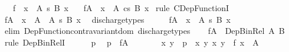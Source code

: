 \begin{isabellebody}
\ \ \ {\isachardoublequoteopen}f\ {\isacharcolon}{\kern0pt}\ {\isacharparenleft}{\kern0pt}x\ {\isacharcolon}{\kern0pt}\ A{\isacharparenright}{\kern0pt}\ {\isasymrightarrow}s\ B\ x{\isachardoublequoteclose}\isanewline
\ \ \ {\isachardoublequoteopen}f{\isasymrestriction}\isactrlbsub A\isactrlesub \ {\isacharcolon}{\kern0pt}\ {\isacharparenleft}{\kern0pt}x\ {\isacharcolon}{\kern0pt}\ A{\isacharparenright}{\kern0pt}\ {\isasymrightarrow}cs\ B\ x{\isachardoublequoteclose}\isanewline
%
\isadelimproof
%
\endisadelimproof
%
\isatagproof
{}\isamarkupfalse%
\ {\isacharparenleft}{\kern0pt}rule\ CDep{\isacharunderscore}{\kern0pt}FunctionI{\isacharparenright}{\kern0pt}\isanewline
\ \ \isamarkupfalse%
\ {\isachardoublequoteopen}f{\isasymrestriction}\isactrlbsub A\isactrlesub \ {\isacharcolon}{\kern0pt}\ {\isacharparenleft}{\kern0pt}x\ {\isacharcolon}{\kern0pt}\ A\ {\isacharampersand}{\kern0pt}\ A{\isacharparenright}{\kern0pt}\ {\isasymrightarrow}s\ B\ x{\isachardoublequoteclose}\ \isamarkupfalse%
\ discharge{\isacharunderscore}{\kern0pt}types\isanewline
\ \ \isamarkupfalse%
\ \isamarkupfalse%
\ {\isachardoublequoteopen}f{\isasymrestriction}\isactrlbsub A\isactrlesub \ {\isacharcolon}{\kern0pt}\ {\isacharparenleft}{\kern0pt}x\ {\isacharcolon}{\kern0pt}\ A{\isacharparenright}{\kern0pt}\ {\isasymrightarrow}s\ B\ x{\isachardoublequoteclose}\isanewline
\ \ \ \ \isamarkupfalse%
\ {\isacharparenleft}{\kern0pt}elim\ Dep{\isacharunderscore}{\kern0pt}Function{\isacharunderscore}{\kern0pt}contravariant{\isacharunderscore}{\kern0pt}dom{\isacharparenright}{\kern0pt}\ discharge{\isacharunderscore}{\kern0pt}types\isanewline
\ \ \isamarkupfalse%
\ {\isachardoublequoteopen}f{\isasymrestriction}\isactrlbsub A\isactrlesub \ {\isacharcolon}{\kern0pt}\ Dep{\isacharunderscore}{\kern0pt}Bin{\isacharunderscore}{\kern0pt}Rel\ A\ B{\isachardoublequoteclose}\isanewline
\ \ \isamarkupfalse%
\ {\isacharparenleft}{\kern0pt}rule\ Dep{\isacharunderscore}{\kern0pt}Bin{\isacharunderscore}{\kern0pt}RelI{\isacharparenright}{\kern0pt}\isanewline
\ \ \ \ \isamarkupfalse%
\ p\ \isamarkupfalse%
\ {\isachardoublequoteopen}p\ {\isasymin}\ f{\isasymrestriction}\isactrlbsub A\isactrlesub {\isachardoublequoteclose}\isanewline
\ \ \ \ \isamarkupfalse%
\ \isamarkupfalse%
\ x\ y\ \ {\isachardoublequoteopen}p\ {\isacharequal}{\kern0pt}\ {\isasymlangle}x{\isacharcomma}{\kern0pt}\ y{\isasymrangle}{\isachardoublequoteclose}\ {\isachardoublequoteopen}{\isasymlangle}x{\isacharcomma}{\kern0pt}\ y{\isasymrangle}\ {\isasymin}\ f{\isachardoublequoteclose}\ {\isachardoublequoteopen}x\ {\isacharcolon}{\kern0pt}\ A{\isachardoublequoteclose}\ \isamarkupfalse%

\end{isabellebody}
